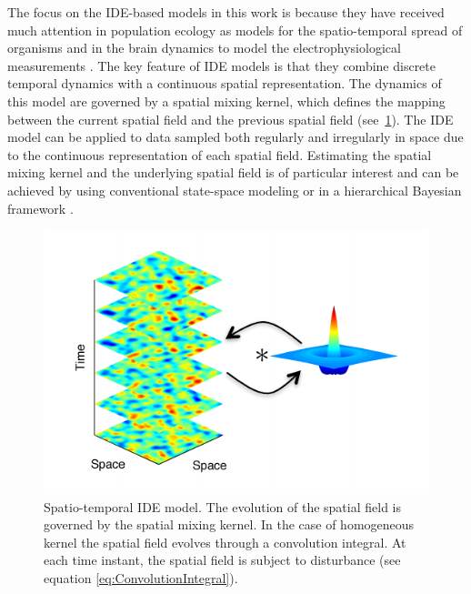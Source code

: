 \documentclass[10pt,twocolumn,twoside]{IEEEtran}
\begin{document}
The focus on the IDE-based models in this work is because they have received much attention in population ecology as models for the spatio-temporal spread of organisms \cite{Kot1992,Kot1996} and in the brain dynamics to model the electrophysiological measurements \cite{Deco2008,Schiff2008,Freestone2011}. The key feature of IDE models is that they combine discrete temporal dynamics with a continuous spatial representation. The dynamics of this model are governed by a spatial mixing kernel, which defines the mapping between the current spatial field and the previous spatial field (see~\figurename{\ref{fig:IDEConcept}}). The IDE model can be applied to data sampled both regularly and irregularly in space due to the continuous representation of each spatial field. Estimating the spatial mixing kernel and the underlying spatial field is of particular interest and can be achieved by  using conventional state-space modeling \cite{Dewar2009,Scerri2009} or in a hierarchical Bayesian framework \cite{Wikle1999,Xu2005,Wikle2011}. 

\begin{figure}[ht]
	\centering
		\includegraphics[scale=1]{./Graph/FieldsAndKernel_Arrows.pdf}
	\caption{Spatio-temporal IDE model. The evolution of the spatial field is governed by the spatial mixing kernel. In the case of homogeneous kernel the spatial field evolves through a convolution integral. At each time instant, the spatial field is subject to disturbance (see equation \eqref{eq:ConvolutionIntegral}). }
	\label{fig:IDEConcept}
\end{figure}
\end{document}
